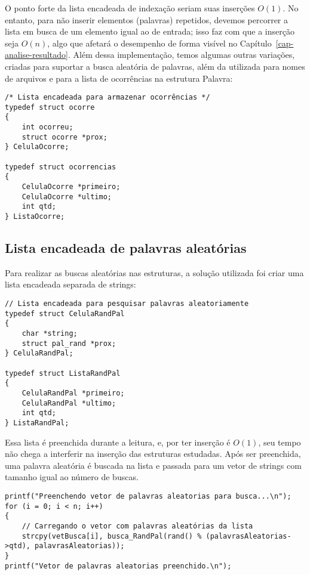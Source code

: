 O ponto forte da lista encadeada de indexação seriam suas inserções $O(1)$. No entanto, para não inserir elementos (palavras) repetidos, devemos percorrer a lista em busca de um elemento igual ao de entrada; isso faz com que a inserção seja $O(n)$, algo que afetará o desempenho de forma visível no Capítulo~\ref{cap-analise-resultado}. Além dessa implementação, temos algumas outras variações, criadas para suportar a busca aleatória de palavras, além da utilizada para nomes de arquivos e para a lista de ocorrências na estrutura Palavra:

\begin{lstlisting}
/* Lista encadeada para armazenar ocorrências */
typedef struct ocorre
{
    int ocorreu;
    struct ocorre *prox;
} CelulaOcorre;

typedef struct ocorrencias
{
    CelulaOcorre *primeiro;
    CelulaOcorre *ultimo;
    int qtd;
} ListaOcorre;
\end{lstlisting}

\subsection{Lista encadeada de palavras aleatórias}

Para realizar as buscas aleatórias nas estruturas, a solução utilizada foi criar uma lista encadeada separada de strings:
\begin{lstlisting}
// Lista encadeada para pesquisar palavras aleatoriamente
typedef struct CelulaRandPal
{
    char *string;
    struct pal_rand *prox;
} CelulaRandPal;

typedef struct ListaRandPal
{
    CelulaRandPal *primeiro;
    CelulaRandPal *ultimo;
    int qtd;
} ListaRandPal;
\end{lstlisting}

Essa lista é preenchida durante a leitura, e, por ter inserção é $O(1)$, seu tempo não chega a interferir na inserção das estruturas estudadas. Após ser preenchida, uma palavra aleatória é buscada na lista e passada para um vetor de strings com tamanho igual ao número de buscas.

\begin{lstlisting}
printf("Preenchendo vetor de palavras aleatorias para busca...\n");
for (i = 0; i < n; i++)
{
    // Carregando o vetor com palavras aleatórias da lista
    strcpy(vetBusca[i], busca_RandPal(rand() % (palavrasAleatorias->qtd), palavrasAleatorias));
}
printf("Vetor de palavras aleatorias preenchido.\n");
\end{lstlisting}

